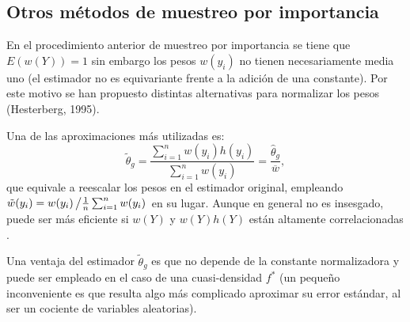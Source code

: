 \documentclass[
  spanish,
  10pt,
]{book}
\theoremstyle{break}
\theoremstyle{nonumberplain}
\begin{document}
\subsection{Otros métodos de muestreo por importancia}\label{mc-imp-otros}

En el procedimiento anterior de muestreo por importancia se tiene que \(E \left( w(Y) \right) = 1\) sin embargo los pesos \(w(y_i)\) no tienen necesariamente media uno (el estimador no es equivariante frente a la adición de una constante).
Por este motivo se han propuesto distintas alternativas para normalizar los pesos (Hesterberg, 1995).

Una de las aproximaciones más utilizadas es:
\[\tilde{\theta}_{g} = \frac{\sum\limits_{i=1}^n w(y_i) h\left( y_i\right) }{ \sum\limits_{i=1}^n w(y_i)} = \frac{\hat{\theta}_{g}}{\overline w},\]
que equivale a reescalar los pesos en el estimador original, empleando \(\tilde w(y_i) = w(y_i)\left/ \frac{1}{n}\sum\nolimits_{i=1}^n w(y_i) \right.\) en su lugar.
Aunque en general no es insesgado, puede ser más eficiente si \(w(Y)\) y \(w(Y)h(Y)\) están altamente correlacionadas \citep[e.g.][p.35]{liu2004}.

Una ventaja del estimador \(\tilde{\theta}_{g}\) es que no depende de la constante normalizadora y puede ser empleado en el caso de una cuasi-densidad \(f^{\ast}\)
(un pequeño inconveniente es que resulta algo más complicado aproximar su error estándar, al ser un cociente de variables aleatorias).
\end{document}
